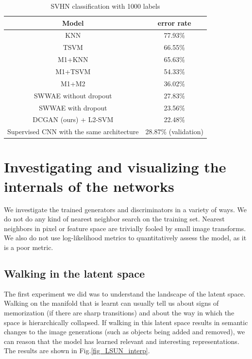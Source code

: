 \documentclass{article} %
\begin{document}
\begin{table}[h]
\caption{SVHN classification with 1000 labels}
\begin{center}
\begin{tabular}{ |c|c| }
    \hline
    \textbf{Model} & error rate\\
    \hline
    KNN & 77.93\%\\
    TSVM & 66.55\%\\
    M1+KNN & 65.63\%\\
    M1+TSVM & 54.33\%\\
    M1+M2 & 36.02\%\\
    \hline
    SWWAE without dropout & 27.83\%\\
    SWWAE with dropout & 23.56\%\\
    \hline
    DCGAN (ours) + L2-SVM & 22.48\%\\
    Supervised CNN with the same architecture & 28.87\% (validation)\\
    \hline
\end{tabular}
\end{center}
\label{tab:svhn_results}
\end{table}

\section{Investigating and visualizing the internals of the networks}

We investigate the trained generators and discriminators in a variety of ways. We do not do any kind of nearest neighbor search on the training set. Nearest neighbors in pixel or feature space are trivially fooled \citep{Theis2015d} by small image transforms. We also do not use log-likelihood metrics to quantitatively assess the model, as it is a poor \citep{Theis2015d} metric. 

\subsection{Walking in the latent space}
The first experiment we did was to understand the landscape of the latent space. Walking on the manifold that is learnt can usually tell us about signs of memorization (if there are sharp transitions) and about the way in which the space is hierarchically collapsed. If walking in this latent space results in semantic changes to the image generations (such as objects being added and removed), we can reason that the model has learned relevant and interesting representations. The results are shown in Fig.\ref{fig_LSUN_interp}.
\end{document}
